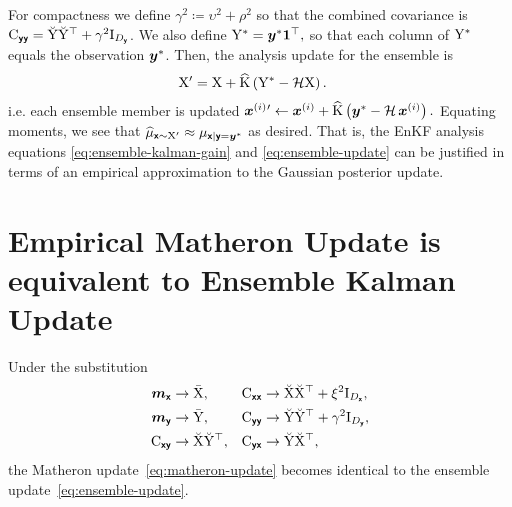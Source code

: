 \documentclass[wcp]{jmlr} %
\begin{document}
For compactness we define \(\gamma^2 \coloneq \upsilon^2 + \rho^2\) so that the combined covariance is \(\mathrm{C}_{\boldsymbol{\mathsf{yy}}} = \breve{\mathrm{Y}} \breve{\mathrm{Y}}^\top + \gamma^2\mathrm{I}_{D_{\boldsymbol{\mathsf{y}}}}\).
We also define
$\mathrm{Y}^* = \boldsymbol{y}^* \mathbf{1}^\top,$
so that each column of \(\mathrm{Y}^*\) equals the observation \(\boldsymbol{y}^*\). Then, the analysis update for the ensemble is
\begin{align}
    \mathrm{X}' &= \mathrm{X} + \widehat{\mathrm{K}} \left(\mathrm{Y}^* - \mathcal{H}\mathrm{X}\right).\label{eq:ensemble-update}
\end{align}
i.e. each ensemble member is updated
\(\boldsymbol{x}^{(i)}{}' \gets \boldsymbol{x}^{(i)} + \widehat{\mathrm{K}} \left(\boldsymbol{y}^* - \mathcal{H}\,\boldsymbol{x}^{(i)}\right).\)
Equating moments, we see that
\(\ELaw[\vrv{x}\sim \mm{X}']
\approx \Law[\vrv{x} \gvn \vrv{y}=\vv{y}^*] \) as desired.
That is, the EnKF analysis equations \eqref{eq:ensemble-kalman-gain} and \eqref{eq:ensemble-update} can be justified in terms of an empirical approximation to the Gaussian posterior update.

\section{Empirical Matheron Update is equivalent to Ensemble Kalman Update}
Under the substitution
\begin{align}
    \boldsymbol{m}_{\boldsymbol{\mathsf{x}}} &\to \bar{\mathrm{X}}, & \mathrm{C}_{\boldsymbol{\mathsf{xx}}} &\to \breve{\mathrm{X}} \breve{\mathrm{X}}^\top + \xi^2\mathrm{I}_{D_{\boldsymbol{\mathsf{x}}}},\\
    \boldsymbol{m}_{\boldsymbol{\mathsf{y}}} &\to \bar{\mathrm{Y}}, & \mathrm{C}_{\boldsymbol{\mathsf{yy}}} &\to \breve{\mathrm{Y}} \breve{\mathrm{Y}}^\top + \gamma^2\mathrm{I}_{D_{\boldsymbol{\mathsf{y}}}},\\
    \mathrm{C}_{\boldsymbol{\mathsf{xy}}} &\to \breve{\mathrm{X}} \breve{\mathrm{Y}}^\top, & \mathrm{C}_{\boldsymbol{\mathsf{yx}}} &\to \breve{\mathrm{Y}} \breve{\mathrm{X}}^\top,
\end{align}
the Matheron update~\eqref{eq:matheron-update} becomes identical to the ensemble update~\eqref{eq:ensemble-update}.
\end{document}
